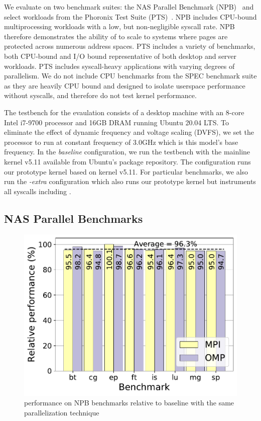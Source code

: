 \documentclass[letterpaper,twocolumn,10pt, anonymous]{article}
\begin{document}
We evaluate \tiktok on two benchmark suites: the NAS Parallel 
Benchmark (NPB)~\cite{npb} and select workloads from the 
Phoronix Test Suite (PTS)~\cite{pts}. 
NPB includes CPU-bound multiprocessing workloads with a 
low, but non-negligible syscall rate. 
NPB therefore demonstrates the ability of \tiktok to 
scale to systems where pages are protected across numerous 
address spaces.
PTS includes a variety of benchmarks, both CPU-bound and 
I/O bound representative of both desktop and server workloads.
PTS includes syscall-heavy applications with varying degrees 
of parallelism.
We do not include CPU benchmarks from the SPEC benchmark suite
as they are heavily CPU bound and designed to isolate userspace 
performance without syscalls, and therefore do not test kernel 
performance.

The testbench for the evaulation consists of a desktop machine 
with an 8-core Intel i7-9700 processor and 16GB DRAM running 
Ubuntu 20.04 LTS.
To eliminate the effect of dynamic frequency and voltage 
scaling (DVFS), we set the processor to run at constant 
frequency of 3.0GHz which is this model's base frequency.
In the \emph{baseline} configuration, we run the testbench 
with the mainline kernel v5.11 available from Ubuntu's package 
repository.
The \emph{\tiktok} configuration runs our prototype \tiktok kernel 
based on kernel v5.11.
For particular benchmarks, we also run the \emph{\tiktok-extra}
configuration which also runs our prototype \tiktok kernel
but instruments all syscalls including .

\subsection{NAS Parallel Benchmarks}

\begin{figure}[]
  \includegraphics[width=\linewidth]{img/npb_performance.pdf}
  \caption{\tiktok performance on NPB benchmarks relative to baseline with 
          the same parallelization technique}
  \label{fig:npb_performance}
\end{figure}
\end{document}
